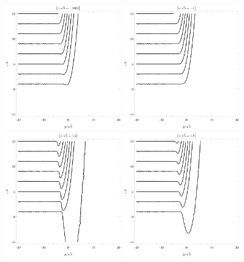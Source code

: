 \begin{figure}[p]
    \centering
    \noindent
    \includegraphics[width=0.45\textwidth]{grafy/robin-1000.pdf}%
    \hspace{0.1\textwidth}%
    \includegraphics[width=0.45\textwidth]{grafy/robin-1.pdf}%
    \\[1em]%
    \includegraphics[width=0.45\textwidth]{grafy/robin0.5.pdf}%
    \hspace{0.1\textwidth}%
    \includegraphics[width=0.45\textwidth]{grafy/robin0.8.pdf}%

\end{figure}
